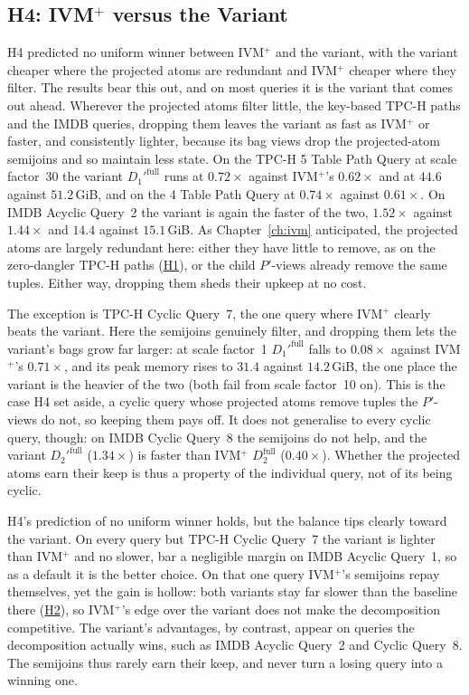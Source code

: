 \subsection{H4: IVM\texorpdfstring{$^+$}{+} versus the Variant}
\label{sec:disc_h4}

H4 predicted no uniform winner between IVM$^+$ and the variant, with the variant cheaper where the projected atoms are redundant and IVM$^+$ cheaper where they filter. The results bear this out, and on most queries it is the variant that comes out ahead. Wherever the projected atoms filter little, the key-based TPC-H paths and the IMDB queries, dropping them leaves the variant as fast as IVM$^+$ or faster, and consistently lighter, because its bag views drop the projected-atom semijoins and so maintain less state. On the TPC-H 5 Table Path Query at scale factor~30 the variant $D_1'^{\text{full}}$ runs at $0.72\times$ against IVM$^+$'s $0.62\times$ and at $44.6$ against $51.2$\,GiB, and on the 4 Table Path Query at $0.74\times$ against $0.61\times$. On IMDB Acyclic Query~2 the variant is again the faster of the two, $1.52\times$ against $1.44\times$ and $14.4$ against $15.1$\,GiB. As Chapter~\ref{ch:ivm} anticipated, the projected atoms are largely redundant here: either they have little to remove, as on the zero-dangler TPC-H paths (\hyperlink{h1}{H1}), or the child $P'$-views already remove the same tuples. Either way, dropping them sheds their upkeep at no cost.

The exception is TPC-H Cyclic Query~7, the one query where IVM$^+$ clearly beats the variant. Here the semijoins genuinely filter, and dropping them lets the variant's bags grow far larger: at scale factor~1 $D_1'^{\text{full}}$ falls to $0.08\times$ against IVM$^+$'s $0.71\times$, and its peak memory rises to $31.4$ against $14.2$\,GiB, the one place the variant is the heavier of the two (both fail from scale factor~10 on). This is the case H4 set aside, a cyclic query whose projected atoms remove tuples the $P'$-views do not, so keeping them pays off. It does not generalise to every cyclic query, though: on IMDB Cyclic Query~8 the semijoins do not help, and the variant $D_2'^{\text{full}}$ ($1.34\times$) is faster than IVM$^+$ $D_2^{\text{full}}$ ($0.40\times$). Whether the projected atoms earn their keep is thus a property of the individual query, not of its being cyclic.

H4's prediction of no uniform winner holds, but the balance tips clearly toward the variant. On every query but TPC-H Cyclic Query~7 the variant is lighter than IVM$^+$ and no slower, bar a negligible margin on IMDB Acyclic Query~1, so as a default it is the better choice. On that one query IVM$^+$'s semijoins repay themselves, yet the gain is hollow: both variants stay far slower than the baseline there (\hyperlink{h2}{H2}), so IVM$^+$'s edge over the variant does not make the decomposition competitive. The variant's advantages, by contrast, appear on queries the decomposition actually wins, such as IMDB Acyclic Query~2 and Cyclic Query~8. The semijoins thus rarely earn their keep, and never turn a losing query into a winning one.

